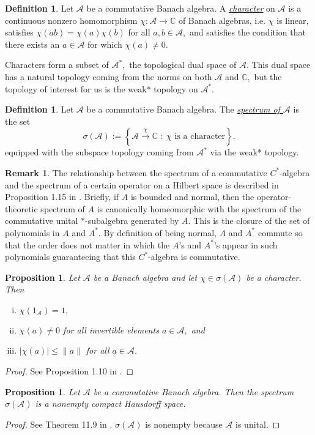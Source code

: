 \documentclass[12pt]{article}
\edef\t{\pgfmathresult}%
\theoremstyle{theorem}
\newtheorem{proposition}[equation]{Proposition}
\theoremstyle{definition}
\newtheorem{definition}[equation]{Definition}
\newtheorem{remark}[equation]{Remark}
\numberwithin{equation}{section}
\let\s=\sigma \let\t=\tau \let\u=\upsilon \let\f=\phi \let\c=\chi
\let\C=\Chi \let\W=\Omega
\newcommand{\be}{\begin{equation}}
\newcommand{\ee}{\end{equation}}
\newcommand{\bn}{\begin{proposition}}
\newcommand{\en}{\end{proposition}}
\newcommand{\bd}{\begin{definition}}
\newcommand{\ed}{\end{definition}}
\newcommand{\bprf}{\begin{proof}}
\newcommand{\eprf}{\end{proof}}
\newcommand{\br}{\begin{remark}}
\newcommand{\er}{\end{remark}}
\newcommand{\<}{\langle}
\renewcommand{\>}{\rangle}
\def\C{{{\mathbb C}}}
\def\mA{{{\mathcal{A}}}}
\begin{document}
\bd
Let $\mathcal{A}$ be a commutative Banach algebra. 
A \emph{\uline{character}} 
on $\mathcal{A}$ is a continuous nonzero homomorphism 
$\chi : \mathcal{A} \to \C$ of Banach algebras, i.e. 
$\chi$ is linear, satisfies $\chi(ab)=\chi(a)\chi(b)$ for all $a,b\in\mA,$
and satisfies the condition that there exists an $a\in\mA$ 
for which $\chi(a)\ne0.$
\ed

Characters form a subset of $\mA^{*},$
the topological dual space of $\mA.$ This dual space
has a natural topology coming from
the norms on both $\mA$ and $\C,$ 
but the topology of interest for us is the
weak* topology on $\mA^{*}.$

\bd
\label{def:spectrum}
Let $\mathcal{A}$ be a commutative Banach algebra. The 
\emph{\uline{spectrum of $\mathcal{A}$}} is the set 
\be
\s(\mathcal{A}):=
\left\{\mathcal{A}\xrightarrow{\chi}\C \;:\;\chi\text{ is a character} \right \}. 
\ee
equipped with the subspace topology coming from $\mathcal{A}^{*}$  
via the weak* topology.
\ed

\br
The relationship between the spectrum of a commutative $C^*$-algebra
and the spectrum of a certain operator on a Hilbert space is 
described in Proposition 1.15 in \cite{Fo94}. Briefly, if $A$ is bounded and 
normal, then the operator-theoretic spectrum of $A$ is canonically 
homeomorphic with the 
spectrum of the commutative unital $*$-subalgebra generated by $A.$
This is the closure of the set of polynomials in $A$ and $A^*.$ By definition 
of being normal, $A$ and $A^*$ commute so that the order does not matter
in which the $A$'s and $A^*$'s appear in such polynomials guaranteeing that
this $C^*$-algebra is commutative. 
\er

\bn
\label{prop:Folland1.10}
Let $\mA$ be a Banach algebra and let $\chi\in\s(\mA)$ be a character.
Then
\begin{enumerate}[i.]
\setlength{\itemsep}{0pt}
\item
$\chi(1_{\mA})=1,$
\item
$\chi(a)\ne0$ for all invertible elements $a\in\mA,$ and
\item
$|\chi(a)|\le\lVert a\rVert$ for all $a\in\mA.$ 
\end{enumerate}
\en

\bprf
See Proposition 1.10 in \cite{Fo94}.
\eprf

\bn
Let $\mathcal{A}$ be a commutative Banach algebra. 
Then the spectrum
$\s (\mathcal{A})$ is a nonempty compact Hausdorff space. 
\en

\bprf
See Theorem 11.9 in \cite{Ru91}.
$\s(\mA)$ is nonempty because $\mA$ is unital. 
\eprf
\end{document}
